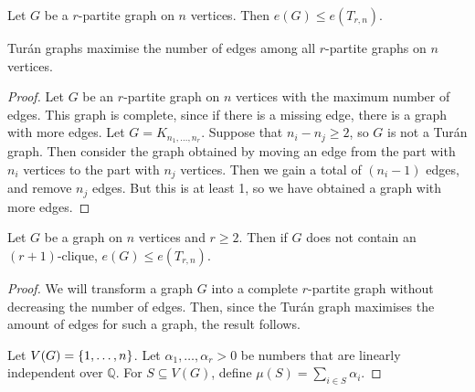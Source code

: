 \begin{proposition}
	Let \( G \) be a \( r \)-partite graph on \( n \) vertices.
	Then \( e(G) \leq e(T_{r,n}) \).
\end{proposition}
\begin{remark}
	Tur\'an graphs maximise the number of edges among all \( r \)-partite graphs on \( n \) vertices.
\end{remark}
\begin{proof}
	Let \( G \) be an \( r \)-partite graph on \( n \) vertices with the maximum number of edges.
	This graph is complete, since if there is a missing edge, there is a graph with more edges.
	Let \( G = K_{n_1, \dots, n_r} \).
	Suppose that \( n_i - n_j \geq 2 \), so \( G \) is not a Tur\'an graph.
	Then consider the graph obtained by moving an edge from the part with \( n_i \) vertices to the part with \( n_j \) vertices.
	Then we gain a total of \( (n_i - 1) \) edges, and remove \( n_j \) edges.
	But this is at least 1, so we have obtained a graph with more edges.
\end{proof}
\begin{theorem}
	Let \( G \) be a graph on \( n \) vertices and \( r \geq 2 \).
	Then if \( G \) does not contain an \( (r+1) \)-clique, \( e(G) \leq e(T_{r,n}) \).
\end{theorem}
\begin{proof}
	We will transform a graph \( G \) into a complete \( r \)-partite graph without decreasing the number of edges.
	Then, since the Tur\'an graph maximises the amount of edges for such a graph, the result follows.

	Let \( V(G) = \qty{1, \dots, n} \).
	Let \( \alpha_1, \dots, \alpha_r > 0 \) be numbers that are linearly independent over \( \mathbb Q \).
	For \( S \subseteq V(G) \), define \( \mu(S) = \sum_{i \in S} \alpha_i \).
\end{proof}
